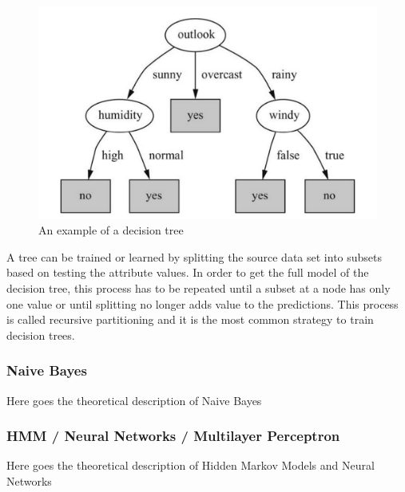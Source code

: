 \begin{figure}[!ht]
	\centering
		\includegraphics[width=1.0\textwidth]{images/decision-tree}
	\caption{An example of a decision tree}
	\label{fig:image-decision-tree}
\end{figure}
\cite{WikipediaDecisionTrees}

A tree can be trained or learned by splitting the source data set into subsets based on testing the attribute values. In order to get the full model of the decision tree, this process has to be repeated until a subset at a node has only one value or until splitting no longer adds value to the predictions. This process is called recursive partitioning and it is the most common strategy to train decision trees.


\subsubsection{Naive Bayes}
Here goes the theoretical description of Naive Bayes

\subsubsection{HMM / Neural Networks / Multilayer Perceptron}
Here goes the theoretical description of Hidden Markov Models and Neural Networks